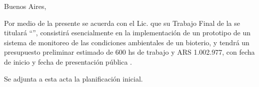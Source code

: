 \documentclass[
11pt, %
]{charter}
\begin{document}
\begin{flushright}
Buenos Aires, \fechaInicioName
\end{flushright}

\vspace{2cm}


Por medio de la presente se acuerda con el Lic. \authorname\hspace{1px} que su Trabajo Final de la \degreename\hspace{1px} se titulará ``\ttitle'', consistirá esencialmente en {la implementación de un prototipo de un sistema de monitoreo de las condiciones ambientales de un bioterio}, y tendrá un presupuesto preliminar estimado de {600} hs de trabajo y {ARS 1.002.977}, con fecha de inicio \fechaInicioName\hspace{1px} y fecha de presentación pública \fechaFinalName.

Se adjunta a esta acta la planificación inicial.

\vfill
\end{document}

